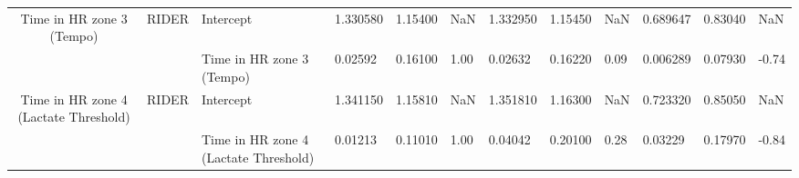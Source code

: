 \begin{tabular}{c}
Time in HR zone 3 (Tempo) & RIDER & Intercept &  1.330580 &  1.15400 &   NaN &  1.332950 &  1.15450 &   NaN &  0.689647 &  0.83040 &   NaN \\
                                      &       & Time in HR zone 3 (Tempo) &   0.02592 &  0.16100 &  1.00 &   0.02632 &  0.16220 &  0.09 &  0.006289 &  0.07930 & -0.74 \\
Time in HR zone 4 (Lactate Threshold) & RIDER & Intercept &  1.341150 &  1.15810 &   NaN &  1.351810 &  1.16300 &   NaN &  0.723320 &  0.85050 &   NaN \\
                                      &       & Time in HR zone 4 (Lactate Threshold) &   0.01213 &  0.11010 &  1.00 &   0.04042 &  0.20100 &  0.28 &   0.03229 &  0.17970 & -0.84 \\
\bottomrule
\end{tabular}
